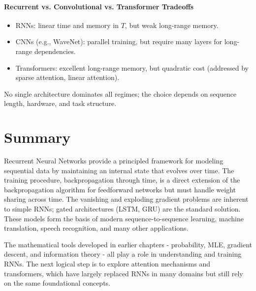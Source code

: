 \documentclass{tufte-handout}
\begin{document}
\paragraph{Recurrent vs. Convolutional vs. Transformer Tradeoffs}
\begin{itemize}
    \item RNNs: linear time and memory in $T$, but weak long-range memory.
    \item CNNs (e.g., WaveNet): parallel training, but require many layers for long-range dependencies.
    \item Transformers: excellent long-range memory, but quadratic cost (addressed by sparse attention, linear attention).
\end{itemize}
No single architecture dominates all regimes; the choice depends on sequence length, hardware, and task structure.


\section{Summary}

Recurrent Neural Networks provide a principled framework for modeling sequential data by maintaining an internal state that evolves over time. The training procedure, backpropagation through time, is a direct extension of the backpropagation algorithm for feedforward networks but must handle weight sharing across time. The vanishing and exploding gradient problems are inherent to simple RNNs; gated architectures (LSTM, GRU) are the standard solution. These models form the basis of modern sequence-to-sequence learning, machine translation, speech recognition, and many other applications.

The mathematical tools developed in earlier chapters - probability, MLE, gradient descent, and information theory - all play a role in understanding and training RNNs. The next logical step is to explore attention mechanisms and transformers, which have largely replaced RNNs in many domains but still rely on the same foundational concepts.
\end{document}

